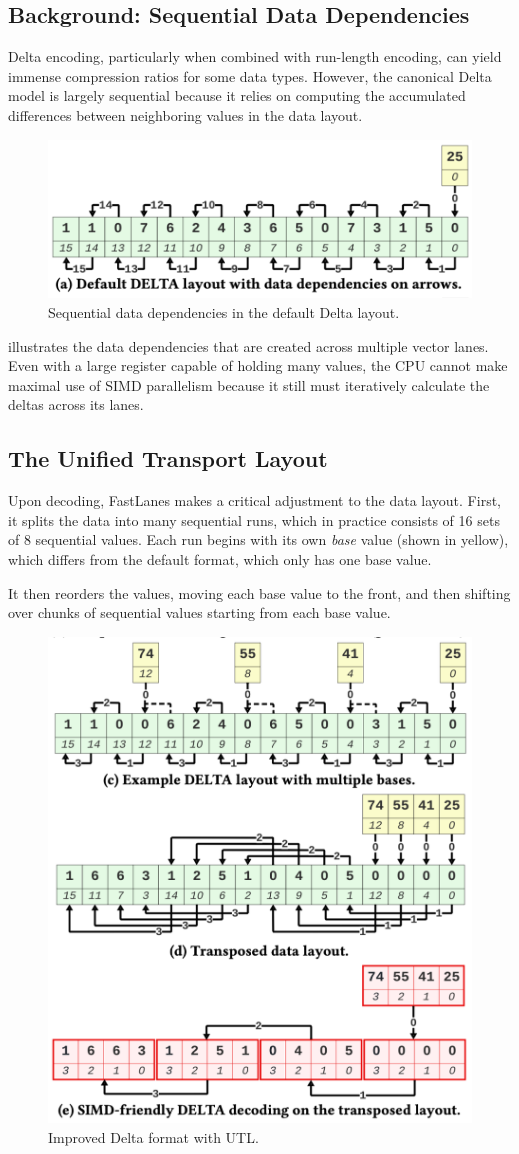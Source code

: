 \documentclass[11pt]{article}
\begin{document}
\subsection{Background: Sequential Data Dependencies}
Delta encoding, particularly when combined with run-length encoding, can yield immense compression ratios for some data types. However, the canonical Delta model is largely sequential because it relies on computing the accumulated differences between neighboring values in the data layout.

\begin{figure}[H]
    \centering
    \includegraphics[width=0.5\linewidth]{fig/default-delta.pdf}
    \caption{Sequential data dependencies in the default Delta layout.}\label{fig:default-delta}
\end{figure}

 illustrates the data dependencies that are created across multiple vector lanes. Even with a large register capable of holding many values, the CPU cannot make maximal use of SIMD parallelism because it still must iteratively calculate the deltas across its lanes.

\subsection{The Unified Transport Layout}
Upon decoding, FastLanes makes a critical adjustment to the data layout. First, it splits the data into many sequential runs, which in practice consists of 16 sets of 8 sequential values. Each run begins with its own \textit{base} value (shown in yellow), which differs from the default format, which only has one base value.

It then reorders the values, moving each base value to the front, and then shifting over chunks of sequential values starting from each base value.\ \cite{fastlanes}

\begin{figure}[H]
    \centering
    \includegraphics[width=0.5\linewidth]{fig/reordered-delta.pdf}
    \caption{Improved Delta format with UTL.}\label{fig:reordered-delta}
\end{figure}
\end{document}
